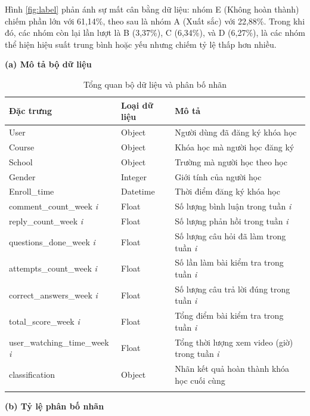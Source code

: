 Hình  \ref{fig:label} phản ánh sự mất cân bằng dữ liệu: nhóm E (Không hoàn thành) chiếm phần lớn với 61,14\%, theo sau là nhóm A (Xuất sắc) với 22,88\%. Trong khi đó, các nhóm còn lại lần lượt là B (3,37\%), C (6,34\%), và D (6,27\%), là các nhóm thể hiện hiệu suất trung bình hoặc yếu nhưng chiếm tỷ lệ thấp hơn nhiều. 
\begin{table}[htbp]
\caption{Tổng quan bộ dữ liệu và phân bố nhãn}
\label{tab:combined-tables}
\centering
\begin{minipage}[t]{0.65\textwidth} %
\centering
\small %
\renewcommand{\arraystretch}{1.3}
\textbf{(a) Mô tả bộ dữ liệu}
\vspace{2mm}

\begin{tabularx}{\textwidth}{|>{\raggedright\arraybackslash}p{3.4cm}|>{\centering\arraybackslash}m{1.2cm}|>{\raggedright\arraybackslash}X|}
\hline
\textbf{Đặc trưng} & \textbf{Loại dữ liệu} & \textbf{Mô tả} \\
\hline
User & Object & Người dùng đã đăng ký khóa học \\
Course & Object & Khóa học mà người học đăng ký \\
School & Object & Trường mà người học theo học \\
Gender & Integer & Giới tính của người học \\
Enroll\_time & Datetime & Thời điểm đăng ký khóa học \\
comment\_count\_week \textit{i} & Float & Số lượng bình luận trong tuần \textit{i} \\
reply\_count\_week \textit{i} & Float & Số lượng phản hồi trong tuần \textit{i} \\
questions\_done\_week \textit{i} & Float & Số lượng câu hỏi đã làm trong tuần \textit{i} \\
attempts\_count\_week \textit{i} & Float & Số lần làm bài kiểm tra trong tuần \textit{i} \\
correct\_answers\_week \textit{i} & Float & Số lượng câu trả lời đúng trong tuần \textit{i} \\
total\_score\_week \textit{i} & Float & Tổng điểm bài kiểm tra trong tuần \textit{i} \\
user\_watching\_time\_week \textit{i} & Float & Tổng thời lượng xem video (giờ) trong tuần \textit{i} \\
classification & Object & Nhãn kết quả hoàn thành khóa học cuối cùng \\
\hline
\multicolumn{3}{l}{$^{\mathrm{*}}$\textit{i} đại diện cho tuần 1 - 4.}
\end{tabularx}
\end{minipage}
\hfill
\begin{minipage}[t]{0.32\textwidth} %
\centering
\small %
\renewcommand{\arraystretch}{1.3}
\textbf{(b) Tỷ lệ phân bố nhãn}
\vspace{2mm}


\end{minipage}
\end{table}
